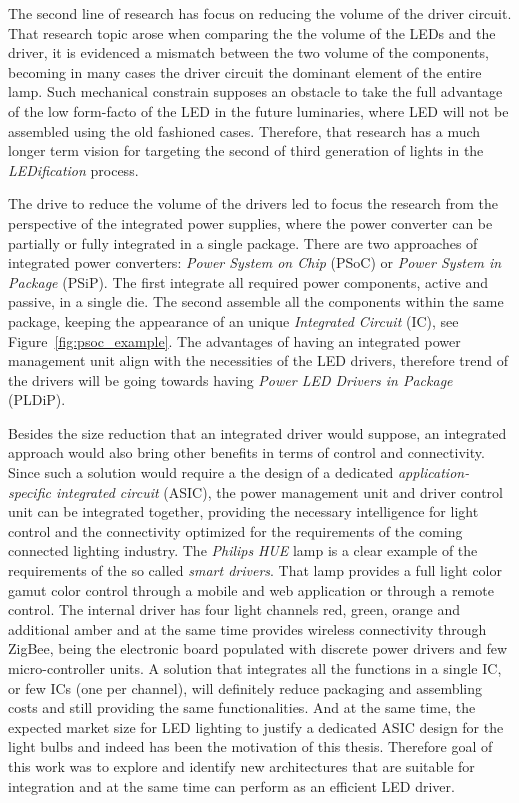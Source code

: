 \vspace{5mm} %

The second line of research has focus on reducing the volume of the driver circuit. That research topic arose when comparing the the volume of the LEDs and the driver, it is evidenced a mismatch between the two volume of the components, becoming in many cases the driver circuit the dominant element of the entire lamp. Such mechanical constrain supposes an obstacle to take the full advantage of the low form-facto of the LED in the future luminaries, where LED will not be assembled using the old fashioned cases. Therefore, that research has a much longer term vision for targeting the second of third generation of lights in the \emph{LEDification} process.

The drive to reduce the volume of the drivers led to focus the research from the perspective of the integrated power supplies, where the power converter can be partially or fully integrated in a single package. There are two approaches of integrated power converters: \emph{Power System on Chip} (PSoC) or  \emph{Power System in Package} (PSiP). The first integrate all required power components, active and passive, in a single die. The second assemble all the components within the same package, keeping the appearance of an unique \emph{Integrated Circuit} (IC), see Figure~\ref{fig:psoc_example}. The advantages of having an integrated power management unit align with the necessities of the LED drivers, therefore trend of the drivers will be going towards having \emph{Power LED Drivers in Package} (PLDiP).

Besides the size reduction that an integrated driver would suppose, an integrated approach would also bring other benefits in terms of control and connectivity. Since such a solution would require a the design of a dedicated \emph{application-specific integrated circuit} (ASIC), the power management unit and driver control unit can be integrated together, providing the necessary intelligence for light control and the connectivity optimized for the requirements of the coming connected lighting industry. The \emph{Philips} \emph{HUE} lamp is a clear example of the requirements of the so called \emph{smart drivers}. That lamp provides a full light color gamut color control through a mobile and web application or through a remote control. The internal driver has four light channels red, green, orange and additional amber and at the same time provides wireless connectivity through ZigBee, being the electronic board populated with discrete power drivers and few micro-controller units. A solution that integrates all the functions in a single IC, or few ICs (one per channel), will definitely reduce packaging and assembling costs and still providing the same functionalities. And at the same time, the expected market size for LED lighting to justify a dedicated ASIC design for the light bulbs and indeed has been the motivation of this thesis. Therefore goal of this work was to explore and identify new architectures that are suitable for integration and at the same time can perform as an efficient LED driver.


